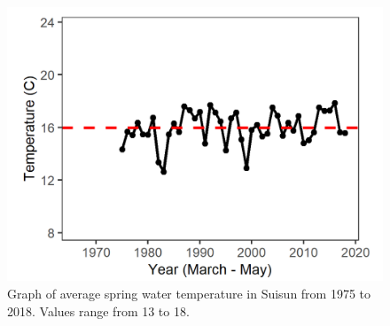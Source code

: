 \documentclass[
]{book}
\begin{document}
\begin{panel-grid}
\begin{columns-nocenter}
\begin{column800}
\begin{expand}
\end{expand}

\end{column800}

\begin{column40}

~

\end{column40}

\begin{column800}

\begin{expand}

\begin{figure}
\includegraphics[width=15.25in]{figures/temp_ssspring} \caption{Graph of average spring water temperature in Suisun from 1975 to 2018. Values range from 13 to 18.}\label{fig:unnamed-chunk-15}
\end{figure}

\end{expand}

\end{column800}

\begin{column40}

~

\end{column40}

\begin{column800}

\begin{expand}


\end{expand}
\end{column800}
\end{columns-nocenter}
\end{panel-grid}
\end{document}
